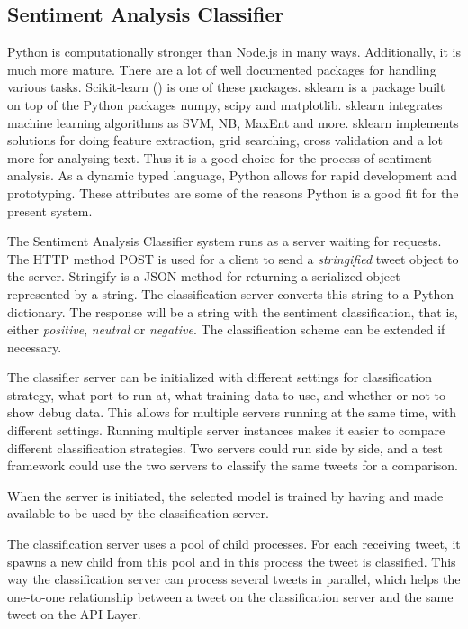 \subsection{Sentiment Analysis Classifier}
\label{sec:classifier_arch}

Python is computationally stronger than Node.js in many ways. Additionally, it is much more mature. There are a lot of well documented packages for handling various tasks. Scikit-learn () is one of these packages. sklearn is a package built on top of the Python packages numpy, scipy and matplotlib. sklearn integrates machine learning algorithms as SVM, NB, MaxEnt and more. sklearn implements solutions for doing feature extraction, grid searching, cross validation and a lot more for analysing text. Thus it is a good choice for the process of sentiment analysis. As a dynamic typed language, Python allows for rapid development and prototyping. These attributes are some of the reasons Python is a good fit for the present system. 

The Sentiment Analysis Classifier system runs as a server waiting for requests. The HTTP method POST is used for a client to send a \textit{stringified} tweet object to the server. Stringify is a JSON method for returning a serialized object represented by a string. The classification server converts this string to a Python dictionary. The response will be a string with the sentiment classification, that is, either \textit{positive}, \textit{neutral} or \textit{negative}. The classification scheme can be extended if necessary. 

The classifier server can be initialized with different settings for classification strategy, what port to run at, what training data to use, and whether or not to show debug data. This allows for multiple servers running at the same time, with different settings. Running multiple server instances makes it easier to compare different classification strategies. Two servers could run side by side, and a test framework could use the two servers to classify the same tweets for a comparison.

When the server is initiated, the selected model is trained by having and made available to be used by the classification server. 

The classification server uses a pool of child processes. For each receiving tweet, it spawns a new child from this pool and in this process the tweet is classified. This way the classification server can process several tweets in parallel, which helps the one-to-one relationship between a tweet on the classification server and the same tweet on the API Layer.

